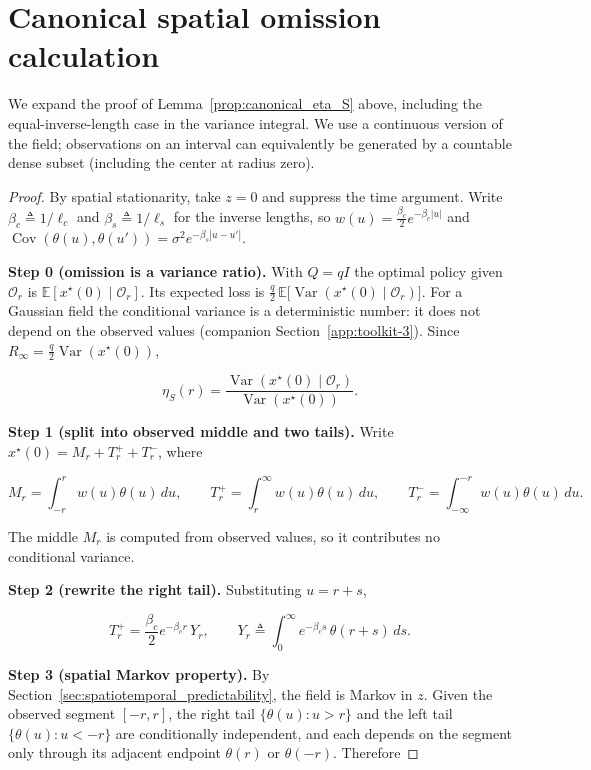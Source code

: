 \section{Canonical spatial omission calculation}
\label{app:technical-canonical}
We expand the proof of Lemma~\ref{prop:canonical_eta_S} above,
including the equal-inverse-length case in the variance integral.
We use a continuous version of the field; observations on an interval can
equivalently be generated by a countable dense subset (including the center
at radius zero).
\begin{proof}
By spatial stationarity, take $z=0$ and suppress the time argument. Write $\beta_c\triangleq1/\ell_c$ and $\beta_s\triangleq1/\ell_s$ for the inverse lengths, so $w(u)=\tfrac{\beta_c}{2}e^{-\beta_c|u|}$ and $\operatorname{Cov}(\theta(u),\theta(u'))=\sigma^2e^{-\beta_s|u-u'|}$.

\textbf{Step 0 (omission is a variance ratio).} With $Q=qI$ the optimal policy given $\mathcal O_r$ is $\mathbb E[x^\star(0)\mid\mathcal O_r]$. Its expected loss is $\tfrac q2\,\mathbb E\big[\operatorname{Var}(x^\star(0)\mid\mathcal O_r)\big]$. For a Gaussian field the conditional variance is a deterministic number: it does not depend on the observed values (companion Section~\ref{app:toolkit-3}). Since $R_\infty=\tfrac q2\operatorname{Var}(x^\star(0))$,

\[
\eta_S(r)=\frac{\operatorname{Var}(x^\star(0)\mid\mathcal O_r)}{\operatorname{Var}(x^\star(0))}.
\]

\textbf{Step 1 (split into observed middle and two tails).} Write $x^\star(0)=M_r+T_r^++T_r^-$, where

\[
M_r=\int_{-r}^{r}w(u)\theta(u)\,du,\qquad T_r^+=\int_r^\infty w(u)\theta(u)\,du,\qquad T_r^-=\int_{-\infty}^{-r}w(u)\theta(u)\,du .
\]

The middle $M_r$ is computed from observed values, so it contributes no conditional variance.

\textbf{Step 2 (rewrite the right tail).} Substituting $u=r+s$,

\[
T_r^+=\frac{\beta_c}{2}e^{-\beta_c r}\,Y_r,\qquad Y_r\triangleq\int_0^\infty e^{-\beta_c s}\,\theta(r+s)\,ds .
\]

\textbf{Step 3 (spatial Markov property).} By Section~\ref{sec:spatiotemporal_predictability}, the field is Markov in $z$. Given the observed segment $[-r,r]$, the right tail $\{\theta(u):u>r\}$ and the left tail $\{\theta(u):u<-r\}$ are conditionally independent, and each depends on the segment only through its adjacent endpoint $\theta(r)$ or $\theta(-r)$. Therefore


\end{proof}
